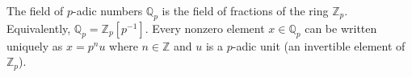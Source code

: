 The field of $p$-adic numbers $\mathbb{Q}_p$ is the field of fractions of the ring $\mathbb{Z}_p$. Equivalently, $\mathbb{Q}_p = \mathbb{Z}_p[p^{-1}]$. Every nonzero element $x \in \mathbb{Q}_p$ can be written uniquely as $x = p^n u$ where $n \in \mathbb{Z}$ and $u$ is a $p$-adic unit (an invertible element of $\mathbb{Z}_p$).
